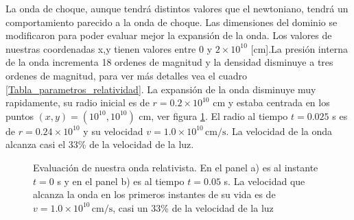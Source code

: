 \documentclass[12pt,a4paper]{book}
\begin{document}
La onda de choque, aunque tendrá distintos valores que el newtoniano, tendrá un comportamiento parecido a la onda de choque. Las dimensiones del dominio se modificaron para poder evaluar mejor la expansión de la onda. Los valores de nuestras coordenadas x,y tienen valores entre $0$ y $2 \times 10^{10}$ [cm].La presión interna de la onda incrementa 18 ordenes de magnitud y la densidad disminuye a tres ordenes de magnitud, para ver más detalles vea el cuadro \ref{Tabla_parametros_relatividad}. La expansión de la onda disminuye muy rapidamente, su radio inicial es de  $r = 0.2 \times 10^{10}$ cm y estaba centrada en los puntos $(x,y) = (10^{10}, 10^{10})$ cm, ver figura \ref{fig:Lax-relativista}. El radio al tiempo $t=0.025$ s es de $r =  0.24 \times 10^{10}$ y su velocidad $v = 1.0 \times 10^{10} \, \mathrm{cm}/\mathrm{s}$. La velocidad de la onda alcanza casi el 33\% de la velocidad de la luz.

\begin{figure}[H]
\centering
{}
\caption{Evaluación de nuestra onda relativista. En el panel a) es al instante $t=0$ s y en el panel b) es al tiempo $t = 0.05$ s. La velocidad que alcanza la onda en los primeros instantes de su vida es de $v = 1.0 \times 10^{10} \, \mathrm{cm}/\mathrm{s}$, casi un 33\% de la velocidad de la luz} \label{fig:Lax-relativista}
\end{figure}
\end{document}
